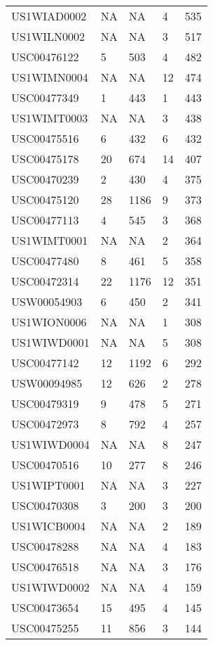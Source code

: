 \begin{longtable}{l l l l l}
				  US1WIAD0002 & NA & NA &   4 & 535 \\ 
				  US1WILN0002 & NA & NA &   3 & 517 \\ 
				  USC00476122 &   5 & 503 &   4 & 482 \\ 
				  US1WIMN0004 & NA & NA &  12 & 474 \\ 
				  USC00477349 &   1 & 443 &   1 & 443 \\ 
				  US1WIMT0003 & NA & NA &   3 & 438 \\ 
				  USC00475516 &   6 & 432 &   6 & 432 \\ 
				  USC00475178 &  20 & 674 &  14 & 407 \\ 
				  USC00470239 &   2 & 430 &   4 & 375 \\ 
				  USC00475120 &  28 & 1186 &   9 & 373 \\ 
				  USC00477113 &   4 & 545 &   3 & 368 \\ 
				  US1WIMT0001 & NA & NA &   2 & 364 \\ 
				  USC00477480 &   8 & 461 &   5 & 358 \\ 
				  USC00472314 &  22 & 1176 &  12 & 351 \\ 
				  USW00054903 &   6 & 450 &   2 & 341 \\ 
				  US1WION0006 & NA & NA &   1 & 308 \\ 
				  US1WIWD0001 & NA & NA &   5 & 308 \\ 
				  USC00477142 &  12 & 1192 &   6 & 292 \\ 
				  USW00094985 &  12 & 626 &   2 & 278 \\ 
				  USC00479319 &   9 & 478 &   5 & 271 \\ 
				  USC00472973 &   8 & 792 &   4 & 257 \\ 
				  US1WIWD0004 & NA & NA &   8 & 247 \\ 
				  USC00470516 &  10 & 277 &   8 & 246 \\ 
				  US1WIPT0001 & NA & NA &   3 & 227 \\ 
				  USC00470308 &   3 & 200 &   3 & 200 \\ 
				  US1WICB0004 & NA & NA &   2 & 189 \\ 
				  USC00478288 & NA & NA &   4 & 183 \\ 
				  USC00476518 & NA & NA &   3 & 176 \\ 
				  US1WIWD0002 & NA & NA &   4 & 159 \\ 
				  USC00473654 &  15 & 495 &   4 & 145 \\ 
				  USC00475255 &  11 & 856 &   3 & 144 \\ 

\end{longtable}
